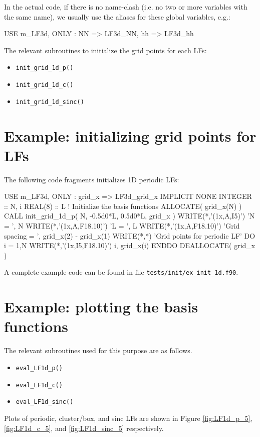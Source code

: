In the actual code, if there is no name-clash (i.e. no two or more variables with the
same name), we usually use the aliases for these global variables, e.g.:
\begin{fortrancode}
USE m_LF3d, ONLY : NN => LF3d_NN, hh => LF3d_hh
\end{fortrancode}

The relevant subroutines to initialize the grid points for each LFs:
\begin{itemize}
\item \texttt{init\_grid\_1d\_p()}
\item \texttt{init\_grid\_1d\_c()}
\item \texttt{init\_grid\_1d\_sinc()}
\end{itemize}



\section{Example: initializing grid points for LFs}

The following code fragments initializes 1D periodic LFs:
\begin{fortrancode}
USE m_LF3d, ONLY : grid_x => LF3d_grid_x
IMPLICIT NONE
INTEGER :: N, i
REAL(8) :: L
! Initialize the basis functions
ALLOCATE( grid_x(N) )
CALL init_grid_1d_p( N, -0.5d0*L, 0.5d0*L, grid_x )
WRITE(*,'(1x,A,I5)') 'N = ', N
WRITE(*,'(1x,A,F18.10)') 'L = ', L
WRITE(*,'(1x,A,F18.10)') 'Grid spacing = ', grid_x(2) - grid_x(1)
WRITE(*,*) 'Grid points for periodic LF'
DO i = 1,N
  WRITE(*,'(1x,I5,F18.10)') i, grid_x(i)
ENDDO
DEALLOCATE( grid_x )
\end{fortrancode}

A complete example code can be found in file \texttt{tests/init/ex\_init\_1d.f90}.


\section{Example: plotting the basis functions}

The relevant subroutines used for this purpose are as follows.
\begin{itemize}
\item \texttt{eval\_LF1d\_p()}
\item \texttt{eval\_LF1d\_c()}
\item \texttt{eval\_LF1d\_sinc()}
\end{itemize}

Plots of periodic, cluster/box, and sinc LFs are
shown in Figure \ref{fig:LF1d_p_5}, \ref{fig:LF1d_c_5}, and
\ref{fig:LF1d_sinc_5} respectively.

